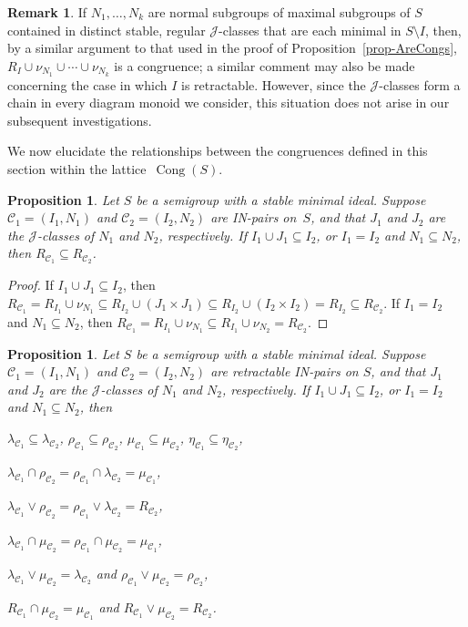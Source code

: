\documentclass[11pt,a4paper]{article}
\newcommand{\C}{\mathscr C}
\newcommand{\gJ}{\mathrel{\mathscr J}}
\newcommand{\lam}{\lambda}
\newcommand{\Cong}{\operatorname{Cong}}
\newcommand{\1}{\id_n}
\newcommand{\sm}{\setminus}
\newcommand{\sub}{\subseteq}
\newcommand{\eit}{\end{itemize}}
\newcommand{\itemit}[1]{\item[\emph{(#1)}]}
\newcommand{\pf}{\begin{proof}}
\newcommand{\epf}{\end{proof}}
\numberwithin{equation}{section}
\newtheorem{prop}[equation]{Proposition}
\theoremstyle{definition}
\newtheorem{rem}[equation]{Remark}
\begin{document}
\begin{rem}
If $N_1,\ldots,N_k$ are normal subgroups of maximal subgroups of $S$ contained in distinct stable, regular $\gJ$-classes that are each minimal in $S\sm I$, then, by a similar argument to that used in the proof of Proposition~\ref{prop-AreCongs}, $R_I\cup\nu_{N_1}\cup\cdots\cup\nu_{N_k}$ is a congruence; a similar comment may also be made concerning the case in which $I$ is retractable.  However, since the $\gJ$-classes form a chain in every diagram monoid we consider, this situation does not arise in our subsequent investigations.
\end{rem}

We now elucidate the relationships between the congruences defined in this section within the lattice~$\Cong(S)$.

\begin{prop}
\label{prop-CR2}
Let $S$ be a semigroup with a stable minimal ideal.  Suppose $\C_1=(I_1,N_1)$ and ${\C_2=(I_2, N_2)}$ are IN-pairs on~$S$, and that $J_1$ and $J_2$ are the $\gJ$-classes of $N_1$
  and $N_2$, respectively. If $I_1\cup J_1\subseteq I_2$, or $I_1=I_2$ and
  $N_1\subseteq N_2$, then $R_{\C_1}\subseteq R_{\C_2}$.
\end{prop}

\pf  If $I_1\cup J_1\subseteq I_2$, then $R_{\C_1}=R_{I_1}\cup \nu_{N_1} \sub R_{I_2}\cup(J_1\times J_1)\sub R_{I_2}\cup(I_2\times I_2)=R_{I_2}\sub R_{\C_2}$.  
%
If $I_1=I_2$ and $N_1\subseteq N_2$, then $R_{\C_1}=R_{I_1}\cup\nu_{N_1}\sub R_{I_1}\cup\nu_{N_2}=R_{\C_2}$.
\epf



\begin{prop}
\label{prop-CR3}
Let $S$ be a semigroup with a stable minimal ideal.  Suppose $\C_1=(I_1,N_1)$ and ${\C_2=(I_2, N_2)}$ are retractable IN-pairs on $S$, and that $J_1$ and $J_2$ are the $\gJ$-classes of $N_1$ and $N_2$, respectively. If $I_1\cup J_1\subseteq I_2$, or $I_1=I_2$ and $N_1\subseteq N_2$, then
\begin{itemize}
\begin{multicols}{2}
\itemit{i} $\lambda_{\C_1}\subseteq \lambda_{\C_2}$,
$\rho_{\C_1}\subseteq \rho_{\C_2}$,
$\mu_{\C_1}\subseteq \mu_{\C_2}$,
$\eta_{\C_1}\subseteq \eta_{\C_2}$,
\itemit{ii} $\lambda_{\C_1}\cap \rho_{\C_2}=\rho_{\C_1}\cap \lambda_{\C_2}=\mu_{\C_1}$, 
\itemit{iii} $\lambda_{\C_1}\vee \rho_{\C_2}=\rho_{\C_1}\vee \lambda_{\C_2}=R_{\C_2}$,
\itemit{iv} $\lam_{\C_1}\cap\mu_{\C_2} = \rho_{\C_1}\cap\mu_{\C_2} = \mu_{\C_1}$,
\itemit{v} $\lam_{\C_1}\vee\mu_{\C_2} = \lam_{\C_2}$ and $\rho_{\C_1}\vee\mu_{\C_2} = \rho_{\C_2}$,
\itemit{vi} $R_{\C_1}\cap\mu_{\C_2}=\mu_{\C_1}$ and $R_{\C_1}\vee\mu_{\C_2}=R_{\C_2}$.
\end{multicols}
\eit
\end{prop}
\end{document}
